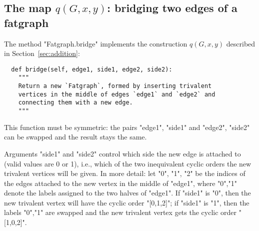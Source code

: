\subsection{The map $q(G,x,y)$: bridging two edges of a fatgraph}
\label{sec:bridge}

The method "Fatgraph.bridge" implements the construction $q(G,x,y)$
described in Section~\ref{sec:addition}:
\begin{lstlisting}
  def bridge(self, edge1, side1, edge2, side2):
    """
    Return a new `Fatgraph`, formed by inserting trivalent
    vertices in the middle of edges `edge1` and `edge2` and
    connecting them with a new edge.
    """
\end{lstlisting}
This function must be symmetric: the pairs "edge1", "side1" and
"edge2", "side2" can be swapped and the result stays the same.

Arguments "side1" and "side2" control which side the new edge is
attached to (valid values are 0 or 1), i.e., which of the two
inequivalent cyclic orders the new trivalent vertices will be given.
In more detail: let "0", "1", "2" be the indices of the edges attached
to the new vertex in the middle of "edge1", where "0","1" denote the
labels assigned to the two halves of "edge1".  If "side1" is "0", then
the new trivalent vertex will have the cyclic order "[0,1,2]"; if
"side1" is "1", then the labels "0","1" are swapped and the new
trivalent vertex gets the cyclic order "[1,0,2]".

